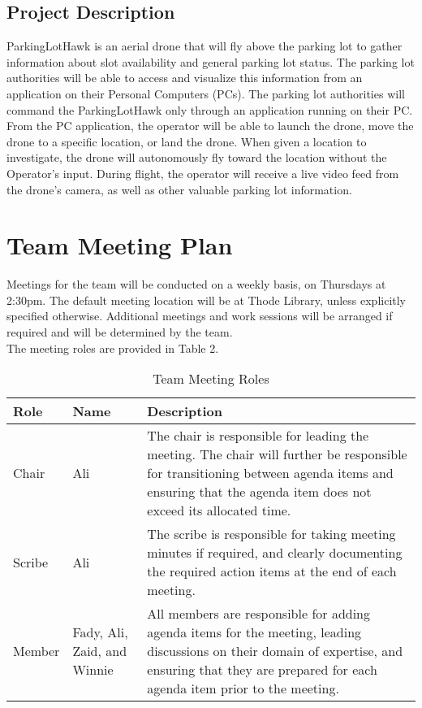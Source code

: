 \documentclass{article}
\begin{document}
\subsection{Project Description}
ParkingLotHawk is an aerial drone that will fly above the parking lot to gather information about slot availability and general parking lot status. The parking lot authorities will be able to access and visualize this information from an application on their Personal Computers (PCs). The parking lot authorities will command the ParkingLotHawk  only through an application running on their PC. From the PC application, the operator will be able to launch the drone, move the drone to a specific location, or land the drone. When given a location to investigate, the drone will autonomously fly toward the location without the Operator's input. During flight, the operator will receive a live video feed from the drone's camera, as well as other valuable parking lot information.

\section{Team Meeting Plan}

Meetings for the team will be conducted on a weekly basis, on Thursdays at 2:30pm. The default meeting location will be at Thode Library, unless explicitly specified otherwise. Additional meetings and work sessions will be arranged if required and will be determined by the team. 
\\
The meeting roles are provided in Table 2.
\begin{table}[!h]
\begin{center}
\caption {Team Meeting Roles} \label{tab:title}
\begin{tabular}{ | m{2cm} | m{2cm} | m{8cm} | }
\hline
 Role & Name & Description \\ 
 \hline
 Chair & Ali & The chair is responsible for leading the meeting. The chair will further be responsible for transitioning between agenda items and ensuring that the agenda item does not exceed its allocated time.   \\  
 \hline
 Scribe & Ali & The scribe is responsible for taking meeting minutes if required, and clearly documenting the required action items at the end of each meeting. \\
 \hline
 Member & Fady, Ali, Zaid, and Winnie & All members are responsible for adding agenda items for the meeting, leading discussions on their domain of expertise, and ensuring that they are prepared for each agenda item prior to the meeting. \\
 \hline
\end{tabular}
\end{center}
\end{table}
\end{document}

